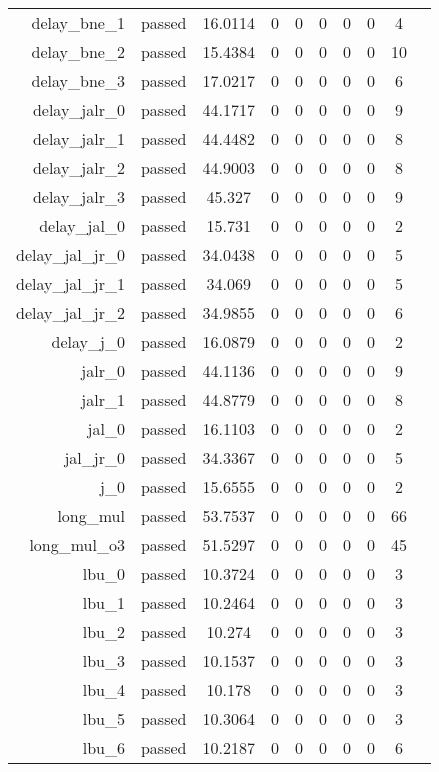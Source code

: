 \begin{longtable}{r|ccccccccc}
    delay\_bne\_1 & passed & 16.0114 & 0 & 0 & 0 & 0 & 0 & 4 \\
    delay\_bne\_2 & passed & 15.4384 & 0 & 0 & 0 & 0 & 0 & 10 \\
    delay\_bne\_3 & passed & 17.0217 & 0 & 0 & 0 & 0 & 0 & 6 \\
    delay\_jalr\_0 & passed & 44.1717 & 0 & 0 & 0 & 0 & 0 & 9 \\
    delay\_jalr\_1 & passed & 44.4482 & 0 & 0 & 0 & 0 & 0 & 8 \\
    delay\_jalr\_2 & passed & 44.9003 & 0 & 0 & 0 & 0 & 0 & 8 \\
    delay\_jalr\_3 & passed & 45.327 & 0 & 0 & 0 & 0 & 0 & 9 \\
    delay\_jal\_0 & passed & 15.731 & 0 & 0 & 0 & 0 & 0 & 2 \\
    delay\_jal\_jr\_0 & passed & 34.0438 & 0 & 0 & 0 & 0 & 0 & 5 \\
    delay\_jal\_jr\_1 & passed & 34.069 & 0 & 0 & 0 & 0 & 0 & 5 \\
    delay\_jal\_jr\_2 & passed & 34.9855 & 0 & 0 & 0 & 0 & 0 & 6 \\
    delay\_j\_0 & passed & 16.0879 & 0 & 0 & 0 & 0 & 0 & 2 \\
    jalr\_0 & passed & 44.1136 & 0 & 0 & 0 & 0 & 0 & 9 \\
    jalr\_1 & passed & 44.8779 & 0 & 0 & 0 & 0 & 0 & 8 \\
    jal\_0 & passed & 16.1103 & 0 & 0 & 0 & 0 & 0 & 2 \\
    jal\_jr\_0 & passed & 34.3367 & 0 & 0 & 0 & 0 & 0 & 5 \\
    j\_0 & passed & 15.6555 & 0 & 0 & 0 & 0 & 0 & 2 \\
    long\_mul & passed & 53.7537 & 0 & 0 & 0 & 0 & 0 & 66 \\
    long\_mul\_o3 & passed & 51.5297 & 0 & 0 & 0 & 0 & 0 & 45 \\
    lbu\_0 & passed & 10.3724 & 0 & 0 & 0 & 0 & 0 & 3 \\
    lbu\_1 & passed & 10.2464 & 0 & 0 & 0 & 0 & 0 & 3 \\
    lbu\_2 & passed & 10.274 & 0 & 0 & 0 & 0 & 0 & 3 \\
    lbu\_3 & passed & 10.1537 & 0 & 0 & 0 & 0 & 0 & 3 \\
    lbu\_4 & passed & 10.178 & 0 & 0 & 0 & 0 & 0 & 3 \\
    lbu\_5 & passed & 10.3064 & 0 & 0 & 0 & 0 & 0 & 3 \\
    lbu\_6 & passed & 10.2187 & 0 & 0 & 0 & 0 & 0 & 6 \\

\end{longtable}
